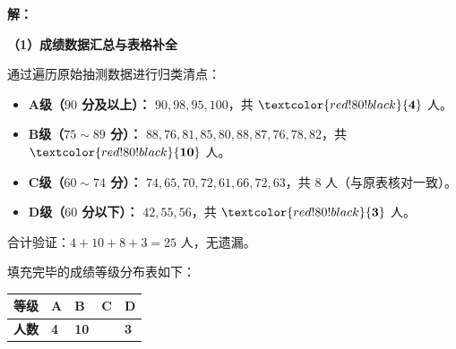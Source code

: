 \documentclass[12pt, a4paper]{ctexrep}
\begin{document}
\vspace{0.4cm}
\textbf{解：}

\textbf{（1）成绩数据汇总与表格补全}

通过遍历原始抽测数据进行归类清点：
\begin{itemize}
    \item \textbf{A级（$90$ 分及以上）：} $90, 98, 95, 100$，共 $\textcolor{red!80!black}{\mathbf{4}}$ 人。
    \item \textbf{B级（$75\sim 89$ 分）：} $88, 76, 81, 85, 80, 88, 87, 76, 78, 82$，共 $\textcolor{red!80!black}{\mathbf{10}}$ 人。
    \item \textbf{C级（$60\sim 74$ 分）：} $74, 65, 70, 72, 61, 66, 72, 63$，共 \textbf{$8$} 人（与原表核对一致）。
    \item \textbf{D级（$60$ 分以下）：} $42, 55, 56$，共 $\textcolor{red!80!black}{\mathbf{3}}$ 人。
\end{itemize}
合计验证：$4 + 10 + 8 + 3 = 25$ 人，无遗漏。

填充完毕的成绩等级分布表如下：
\begin{center}
\renewcommand{\arraystretch}{1.8}
\setlength{\arrayrulewidth}{0.8pt}
\begin{tabular}{|>{\centering\arraybackslash}p{2cm}|>{\centering\arraybackslash}p{2cm}|>{\centering\arraybackslash}p{2cm}|>{\centering\arraybackslash}p{2cm}|>{\centering\arraybackslash}p{2cm}|}
\hline
\textbf{等级} & \textbf{A} & \textbf{B} & \textbf{C} & \textbf{D} \\
\hline
\textbf{人数} & \textcolor{red!80!black}{\textbf{4}} & \textcolor{red!80!black}{\textbf{10}} & 8 & \textcolor{red!80!black}{\textbf{3}} \\
\hline
\end{tabular}
\end{center}
\end{document}

